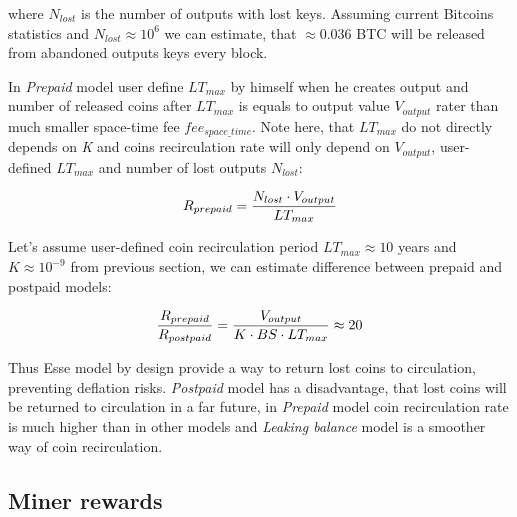\documentclass[]{article}   %
\newcommand{\authnote}[2]{\marginpar{\parbox{\marginparwidth}{\tiny %
  \textsf{#1 {\textcolor{blue}{notes: #2}}}}}%
  \textcolor{blue}{\textbf{\dag}}}
\newcommand{\authnote}[2]{
  \textsf{#1 \textcolor{blue}{: #2}}}
\newcommand{\authnote}[2]{}
\newcommand{\dnote}[1]{{\authnote{\textcolor{blue}{Dima notes}}{#1}}}
\newcommand{\esse}{Esse}
\begin{document}
where $N_{lost}$ is the number of outputs with lost keys. Assuming current Bitcoins statistics and $N_{lost}\approx10^6$ we can estimate, that $\approx0.036$ BTC will be released from abandoned outputs keys every block.

In \textit{Prepaid} model user define $LT_{max}$ by himself when he creates output and number of released coins after $LT_{max}$ is equals to output value $V_{output}$ rater than much smaller space-time fee $fee_{space\_time}$. Note here, that $LT_{max}$ do not directly depends on \textit{K} and coins recirculation rate will only depend on $V_{output}$, user-defined $LT_{max}$ and number of lost outputs $N_{lost}$:

\begin{equation}
R_{prepaid} = {N_{lost} \cdot V_{output} \over LT_{max}}
\end{equation}

Let's assume user-defined coin recirculation period $LT_{max}\approx10$ years and $K\approx10^{-9}$ from previous section, we can estimate difference between prepaid and postpaid models:

\begin{equation}
{R_{prepaid} \over R_{postpaid}} = { V_{output}  \over  K \cdot BS \cdot LT_{max}} \approx 20
\end{equation}


 \dnote{Check, should be something like 1000}

Thus \esse{} model by design provide a way to return lost coins to circulation, preventing deflation risks. \textit{Postpaid} model has a disadvantage, that lost coins will be returned to circulation in a far future, in \textit{Prepaid} model coin recirculation rate is much higher than in other models and \textit{Leaking balance} model is a smoother way of coin recirculation.

\subsection{Miner rewards}
\end{document}
